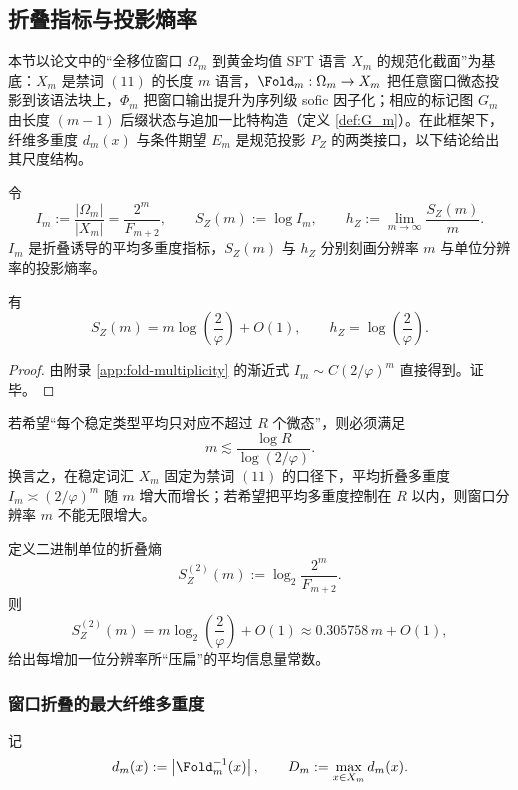 \subsection{折叠指标与投影熵率}\label{subsec:pom-projection-entropy}
本节以论文中的“全移位窗口 $\Omega_m$ 到黄金均值 SFT 语言 $X_m$ 的规范化截面”为基底：$X_m$ 是禁词 $(11)$ 的长度 $m$ 语言，$\Fold_m:\Omega_m\to X_m$ 把任意窗口微态投影到该语法块上，$\Phi_m$ 把窗口输出提升为序列级 sofic 因子化；相应的标记图 $G_m$ 由长度 $(m-1)$ 后缀状态与追加一比特构造（定义 \ref{def:G_m}）。在此框架下，纤维多重度 $d_m(x)$ 与条件期望 $E_m$ 是规范投影 $P_Z$ 的两类接口，以下结论给出其尺度结构。
\begin{definition}[折叠指标与投影熵率]\label{def:pom-fold-index}
令
\[
I_m:=\frac{|\Omega_m|}{|X_m|}=\frac{2^m}{F_{m+2}},
\qquad
S_Z(m):=\log I_m,
\qquad
h_Z:=\lim_{m\to\infty}\frac{S_Z(m)}{m}.
\]
$I_m$ 是折叠诱导的平均多重度指标，$S_Z(m)$ 与 $h_Z$ 分别刻画分辨率 $m$ 与单位分辨率的投影熵率。
\end{definition}

\begin{proposition}[折叠指标的渐近]\label{prop:pom-projection-entropy}
有
\[
S_Z(m)=m\log\!\left(\frac{2}{\varphi}\right)+O(1),
\qquad
h_Z=\log\!\left(\frac{2}{\varphi}\right).
\]
\end{proposition}
\begin{proof}
由附录 \ref{app:fold-multiplicity} 的渐近式
\(
I_m\sim C(2/\varphi)^m
\)
直接得到。证毕。
\end{proof}

\begin{corollary}[分辨率不足的空间门槛]\label{cor:pom-resolution-threshold}
若希望“每个稳定类型平均只对应不超过 $R$ 个微态”，则必须满足
\[
m\lesssim \frac{\log R}{\log(2/\varphi)}.
\]
换言之，在稳定词汇 $X_m$ 固定为禁词 $(11)$ 的口径下，平均折叠多重度 $I_m\asymp (2/\varphi)^m$ 随 $m$ 增大而增长；若希望把平均多重度控制在 $R$ 以内，则窗口分辨率 $m$ 不能无限增大。
\end{corollary}

\begin{remark}[折叠熵的二进制斜率]\label{rem:pom-fold-bits}
定义二进制单位的折叠熵
\[
S_Z^{(2)}(m):=\log_2\frac{2^m}{F_{m+2}}.
\]
则
\[
S_Z^{(2)}(m)=m\log_2\!\left(\frac{2}{\varphi}\right)+O(1)
\approx 0.305758\,m+O(1),
\]
给出每增加一位分辨率所“压扁”的平均信息量常数。
\end{remark}

\subsubsection{窗口折叠的最大纤维多重度}\label{subsec:pom-max-fiber}
记
\[
d_m(x):=\left|\Fold_m^{-1}(x)\right|,
\qquad
D_m:=\max_{x\in X_m} d_m(x).
\]

